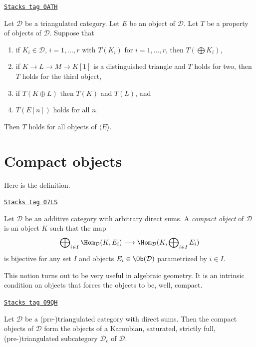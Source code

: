 \begin{remark}
\label{derived-remark-check-on-generator}
\href{https://stacks.math.columbia.edu/tag/0ATH}{\texttt{Stacks tag 0ATH}}

Let $\mathcal{D}$ be a triangulated category. Let $E$ be an object
of $\mathcal{D}$. Let $T$ be a property of objects of $\mathcal{D}$.
Suppose that
\begin{enumerate}
\item if $K_i \in \mathcal{D}$, $i = 1, \ldots, r$ with
$T(K_i)$ for $i = 1, \ldots, r$, then $T(\bigoplus K_i)$,
\item if $K \to L \to M \to K[1]$ is a distinguished triangle and
$T$ holds for two, then $T$ holds for the third object,
\item if $T(K \oplus L)$ then $T(K)$ and $T(L)$, and
\item $T(E[n])$ holds for all $n$.
\end{enumerate}
Then $T$ holds for all objects of $\langle E \rangle$.
\end{remark}

\section{Compact objects}
\label{derived-section-compact}
Here is the definition.

\begin{definition}
\label{derived-definition-compact-object}
\href{https://stacks.math.columbia.edu/tag/07LS}{\texttt{Stacks tag 07LS}}

Let $\mathcal{D}$ be an additive category with arbitrary direct
sums. A {\it compact object} of $\mathcal{D}$ is an object $K$
such that the map
$$
\bigoplus\nolimits_{i \in I} \Hom_{\mathcal{D}}(K, E_i)
\longrightarrow
\Hom_{\mathcal{D}}(K, \bigoplus\nolimits_{i \in I} E_i)
$$
is bijective for any set $I$ and objects
$E_i \in \Ob(\mathcal{D})$ parametrized by $i \in I$.
\end{definition}

This notion turns out to be very useful in algebraic geometry.
It is an intrinsic condition on objects that forces the objects
to be, well, compact.

\begin{lemma}
\label{derived-lemma-compact-objects-subcategory}
\href{https://stacks.math.columbia.edu/tag/09QH}{\texttt{Stacks tag 09QH}}

Let $\mathcal{D}$ be a (pre-)triangulated category with direct sums.
Then the compact objects of $\mathcal{D}$ form the objects of a
Karoubian, saturated, strictly full, (pre-)triangulated subcategory
$\mathcal{D}_c$ of $\mathcal{D}$.
\end{lemma}

